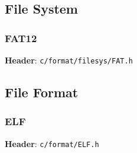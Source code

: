 

\subsection{File System}



\subsubsection{FAT12}

\textbf{Header}: \verb|c/format/filesys/FAT.h|



\subsection{File Format}



\subsubsection{ELF}

\textbf{Header}: \verb|c/format/ELF.h|

